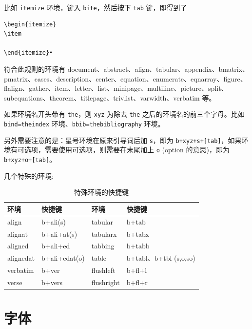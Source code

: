 \documentclass[geye,green,pad,cn]{elegantnote}
\begin{document}
 

比如 \lstinline{itemize} 环境，键入 \lstinline{bite}，然后按下 \lstinline{tab} 键，即得到了

\begin{lstlisting}[frame=single]
\begin{itemize}
\item

\end{itemize}•
\end{lstlisting}

符合此规则的环境有 document、abstract、align、tabular、appendix、bmatrix、pmatrix、cases、description、center、equation、enumerate、eqnarray、figure、flalign、gather、item、letter、list、minipage、multiline、picture、split、subequations、theorem、titlepage、trivlist、varwidth、verbatim 等。

\begin{note}
如果环境名开头带有 \lstinline{the}，则 \lstinline{xyz} 为除去 \lstinline{the} 之后的环境名的前三个字母。比如 \lstinline{bind=theindex} 环境、\lstinline{bbib=thebibliography} 环境。
\end{note}

另外需要注意的是：星号环境在原来引导词后加 \lstinline{s}，即为 \lstinline{b+xyz+s+[tab]}，如果环境有可选项，需要使用可选项，则需要在末尾加上 \lstinline{o} (option 的意思)，即为 \lstinline{b+xyz+o+[tab]}。

几个特殊的环境:

\begin{table}[!htbp]
\small
  \centering
  \caption{特殊环境的快捷键}
    \begin{tabular}{llll}
    \toprule
    环境    & 快捷键   & 环境    & 快捷键 \\
    \midrule
    align  & b+ali(s) & tabular  & b+tab \\
    alignat  & b+ali+at(s) & tabularx  & b+tabx \\
    aligned  & b+ali+ed & tabbing  & b+tabb \\
    alignedat  & b+ali+edat(o) & table  & b+tabl、b+tbl (s,o,so) \\
    verbatim  & b+ver  & flushleft  & b+fl+l \\
    verse  & b+vers & flushright  & b+fl+r \\
    \bottomrule
    \end{tabular}%
  \label{tab:special environment}%
\end{table}%

\section{字体}
\end{document}
